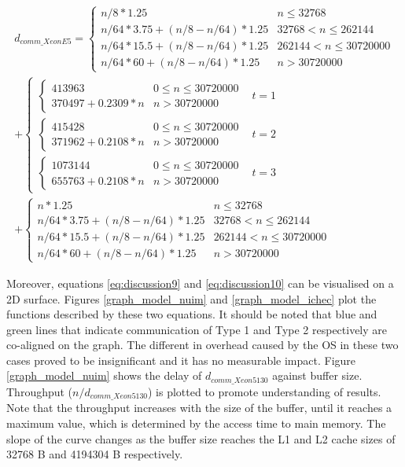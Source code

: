 \begin{equation}\label{eq:discussion10}
\begin{split}
d_{comm\_XeonE5} = \begin{cases} n/8 * 1.25 & n \leq 32768\\n/64 * 3.75 + (n/8 - n/64) * 1.25 & 32768 < n \leq 262144\\n/64 * 15.5 + (n/8 - n/64) * 1.25 & 262144 < n \leq 30720000\\n/64 * 60 + (n/8 - n/64) * 1.25 & n > 30720000\end{cases} \\ + \begin{cases}\begin{cases}413963 & 0 \leq n \leq 30720000 \\ 370497 + 0.2309 * n & n > 30720000\end{cases} & t = 1\\\begin{cases}415428 & 0 \leq n \leq 30720000 \\ 371962 +  0.2108 * n & n > 30720000\end{cases} & t = 2\\\begin{cases}1073144 & 0 \leq n \leq 30720000 \\ 655763 +  0.2108 * n & n > 30720000\end{cases} & t = 3\end{cases} \\ + \begin{cases}n * 1.25 & n \leq 32768\\n/64 * 3.75 + (n/8 - n/64) * 1.25 & 32768 < n \leq 262144\\n/64 * 15.5 + (n/8 - n/64) * 1.25 & 262144 < n \leq 30720000\\n/64 * 60 + (n/8 - n/64) * 1.25 & n > 30720000\end{cases}
\end{split}
\end{equation}

Moreover, equations \ref{eq:discussion9} and \ref{eq:discussion10} can be visualised on a 2D surface. Figures \ref{graph_model_nuim} and \ref{graph_model_ichec} plot the functions described by these two equations. It should be noted that blue and green lines that indicate communication of Type 1 and Type 2 respectively are co-aligned on the graph. The different in overhead caused by the OS in these two cases proved to be insignificant and it has no measurable impact. Figure \ref{graph_model_nuim} shows the delay of $d_{comm\_Xeon5130}$ against buffer size. Throughput ($n / d_{comm\_Xeon5130}$) is plotted to promote understanding of results. Note that the throughput increases with the size of the buffer, until it reaches a maximum value, which is determined by the access time to main memory. The slope of the curve changes as the buffer size reaches the L1 and L2 cache sizes of 32768 B and 4194304 B respectively.

